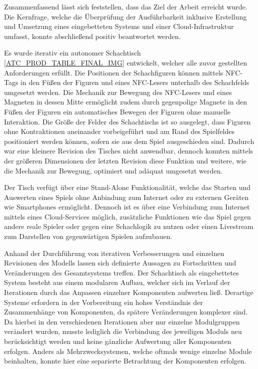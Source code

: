 Zusammenfassend lässt sich feststellen, dass das Ziel der Arbeit
erreicht wurde. Die Kernfrage, welche die Überprüfung der Ausführbarkeit
inklusive Erstellung und Umsetzung eines eingebetteten Systems und einer
Cloud-Infrastruktur umfasst, konnte abschließend positiv beantwortet
werden.

Es wurde iterativ ein autonomer Schachtisch
\ref{ATC_PROD_TABLE_FINAL_IMG} entwickelt, welcher alle zuvor gestellten
Anforderungen erfüllt. Die Positionen der Schachfiguren können mittels
NFC-Tags in den Füßen der Figuren und eines NFC-Lesers unterhalb des
Schachfelds umgesetzt werden. Die Mechanik zur Bewegung des NFC-Lesers
und eines Magneten in dessen Mitte ermöglicht zudem durch gegenpolige
Magnete in den Füßen der Figuren ein automatisches Bewegen der Figuren
ohne manuelle Interaktion. Die Größe der Felder des Schachtischs ist so
ausgelegt, dass Figuren ohne Kontraktionen aneinander vorbeigeführt und
am Rand des Spielfeldes positioniert werden können, sofern sie aus dem
Spiel ausgeschieden sind. Dadurch war eine kleinere Revision des Tisches
nicht anwendbar, dennoch konnten mittels der größeren Dimensionen der
letzten Revision diese Funktion und weitere, wie die Mechanik zur
Bewegung, optimiert und adäquat umgesetzt werden.

Der Tisch verfügt über eine Stand-Alone Funktionalität, welche das
Starten und Auswerten eines Spiels ohne Anbindung zum Internet oder zu
externen Geräten wie Smartphones ermöglicht. Dennoch ist es über eine
Verbindung zum Internet mittels eines Cloud-Services möglich,
zusätzliche Funktionen wie das Spiel gegen andere reale Spieler oder
gegen eine Schachlogik zu nutzen oder einen Livestream zum Darstellen
von gegenwärtigen Spielen aufzubauen.

Anhand der Durchführung von iterativen Verbesserungen und einzelnen
Revisionen des Modells lassen sich definierte Aussagen zu Fortschritten
und Veränderungen des Gesamtsystems treffen. Der Schachtisch als
eingebettetes System besteht aus einem modularen Aufbau, welcher sich im
Verlauf der Iterationen durch das Anpassen einzelner Komponenten
aufwerten ließ. Derartige Systeme erfordern in der Vorbereitung ein
hohes Verständnis der Zusammenhänge von Komponenten, da spätere
Veränderungen komplexer sind. Da hierbei in den verschiedenen
Iterationen aber nur einzelne Modulgruppen verändert wurden, musste
lediglich die Verbindung des jeweiligen Moduls neu berücksichtigt werden
und keine gänzliche Aufwertung aller Komponenten erfolgen. Anders als
Mehrzwecksystemen, welche oftmals wenige einzelne Module beinhalten,
konnte hier eine separierte Betrachtung der Komponenten erfolgen.

